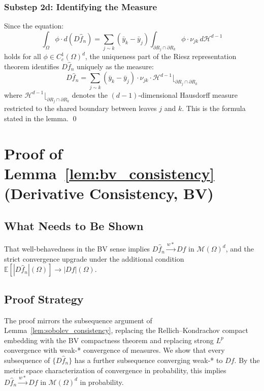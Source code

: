 \documentclass[12pt,a4paper]{article}
\numberwithin{equation}{section}
\theoremstyle{plain}
\theoremstyle{definition}
\newcommand{\E}{\mathbb{E}}
\newcommand{\cM}{\mathcal{M}(\Omega)^d}
\newcommand{\fn}{\hat{f}_n}
\begin{document}
	\subsubsection*{Substep 2d: Identifying the Measure}
	
	Since the equation:
	\begin{equation}
		\int_\Omega \phi \cdot d(D\fn)
		= \sum_{j \sim k} (\bar{y}_k - \bar{y}_j)
		\int_{\partial R_j \cap \partial R_k} \phi \cdot \nu_{jk}
		\, d\mathcal{H}^{d-1}
	\end{equation}
	holds for all $\phi \in C_c^1(\Omega)^d$, the uniqueness part of the Riesz
	representation theorem \citep[Theorem~1.38]{evans2015measure} identifies
	$D\fn$ uniquely as the measure:
	\begin{equation}
		D\fn = \sum_{j \sim k} (\bar{y}_k - \bar{y}_j) \cdot \nu_{jk} \cdot
		\mathcal{H}^{d-1}\lfloor_{\partial R_j \cap \partial R_k}
	\end{equation}
	where $\mathcal{H}^{d-1}\lfloor_{\partial R_j \cap \partial R_k}$ denotes
	the $(d-1)$-dimensional Hausdorff measure restricted to the shared boundary
	between leaves $j$ and $k$. This is the formula stated in the lemma.
	\qed
	
	\section{Proof of Lemma~\ref{lem:bv_consistency}
		(Derivative Consistency, BV)}
	\label{app:lem_bv_consistency}
	
	\subsection{What Needs to Be Shown}
	
	That well-behavedness in the BV sense implies $D\fn \xrightarrow{w*} Df$
	in $\cM$, and the strict convergence upgrade under the additional condition
	$\E[|D\fn|(\Omega)] \to |Df|(\Omega)$.
	
	\subsection{Proof Strategy}
	
	The proof mirrors the subsequence argument of
	Lemma~\ref{lem:sobolev_consistency}, replacing the Rellich--Kondrachov
	compact embedding with the BV compactness theorem and replacing strong $L^p$
	convergence with weak-* convergence of measures. We show that every
	subsequence of $\{D\fn\}$ has a further subsequence converging weak-* to
	$Df$. By the metric space characterization of convergence in probability,
	this implies $D\fn \xrightarrow{w*} Df$ in $\cM$ in probability.
	
\end{document}
